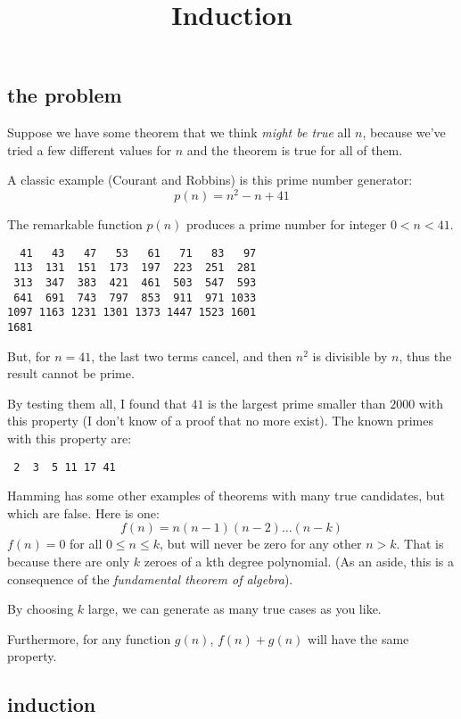 \documentclass[11pt, oneside]{article}
\title{Induction}
\date{}
\begin{document}
\maketitle
\Large

\label{sec:Induction}

\subsection*{the problem}

Suppose we have some theorem that we think \emph{might be true} all $n$, because we've tried a few different values for $n$ and the theorem is true for all of them.  

A classic example (Courant and Robbins) is this prime number generator:
\[ p(n) = n^2 - n + 41 \]

The remarkable function $p(n)$ produces a prime number for integer $0 < n < 41$.

\begin{verbatim}
  41   43   47   53   61   71   83   97
 113  131  151  173  197  223  251  281
 313  347  383  421  461  503  547  593
 641  691  743  797  853  911  971 1033
1097 1163 1231 1301 1373 1447 1523 1601
1681
\end{verbatim}

But, for $n=41$, the last two terms cancel, and then $n^2$ is divisible by $n$, thus the result cannot be prime.

By testing them all, I found that $41$ is the largest prime smaller than $2000$ with this property (I don't know of a proof that no more exist).  The known primes with this property are:

\begin{verbatim}
 2  3  5 11 17 41
\end{verbatim}

Hamming has some other examples of theorems with many true candidates, but which are false.  Here is one:
\[ f(n) = n(n-1)(n-2) \dots (n-k) \]
$f(n)=0$ for all $0 \le n \le k$, but will never be zero for any other $n > k$.  That is because there are only $k$ zeroes of a kth degree polynomial.  (As an aside, this is a consequence of the \emph{fundamental theorem of algebra}).

By choosing $k$ large, we can generate as many true cases as you like.

Furthermore, for any function $g(n)$, $f(n) + g(n)$ will have the same property.

\subsection*{induction}
\end{document}

